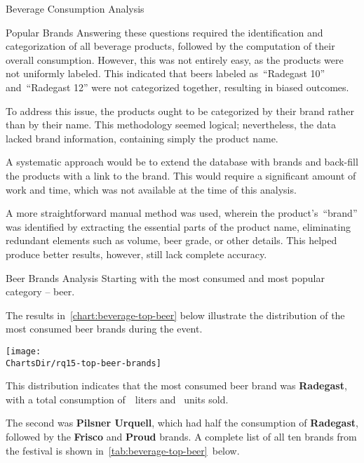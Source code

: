\begin{section}{Beverage Consumption Analysis}
\begin{subsection}{Popular Brands}
		Answering these questions required the identification and categorization of all beverage products, followed by the computation of their overall consumption.
		However, this was not entirely easy, as the products were not uniformly labeled.
		This indicated that beers labeled as~\enquote{Radegast 10} and~\enquote{Radegast 12} were not categorized together, resulting in biased outcomes.

		To address this issue, the products ought to be categorized by their brand rather than by their name.
		This methodology seemed logical; nevertheless, the data lacked brand information, containing simply the product name.

		A systematic approach would be to extend the database with brands and back-fill the products with a link to the brand.
		This would require a significant amount of work and time, which was not available at the time of this analysis.

		A more straightforward manual method was used, wherein the product's~\enquote{brand} was identified by extracting the essential parts of the product name, eliminating redundant elements such as volume, beer grade, or other details.
		This helped produce better results, however, still lack complete accuracy.

		\begin{subsubsection}{Beer Brands Analysis}
			\label{subsubsec:analysis-beverage-popular-beer}
			Starting with the most consumed and most popular category – beer.


			The results in~\autoref{chart:beverage-top-beer} below illustrate the distribution of the most consumed beer brands during the event.

			\begin{chart}[H]
				\centering
				\texttt{[image: \\ChartsDir/rq15-top-beer-brands]}
				\caption{ Most Consumed Beer Brands}
				\label{chart:beverage-top-beer}
				\source
			\end{chart}

			This distribution indicates that the most consumed beer brand was \textbf{Radegast}, with a total consumption of~~liters and~ units sold.

			The second was \textbf{Pilsner Urquell}, which had half the consumption of \textbf{Radegast}, followed by the \textbf{Frisco} and \textbf{Proud} brands.
			A complete list of all ten brands from the festival is shown in~\autoref{tab:beverage-top-beer}~below.


\end{subsubsection}
\end{subsection}
\end{section}
